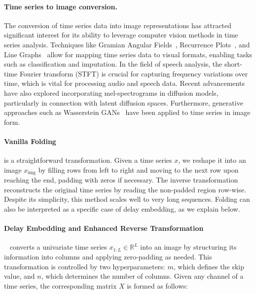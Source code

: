 \documentclass{article}
\theoremstyle{plain}
\theoremstyle{definition}
\theoremstyle{remark}
\begin{document}
\paragraph{Time series to image conversion.} The conversion of time series data into image representations has attracted significant interest for its ability to leverage computer vision methods in time series analysis. Techniques like Gramian Angular Fields~\cite{wang2015imaging}, Recurrence Plots~\cite{hatami2018classification}, and Line Graphs~\cite{li2024time} allow for mapping time series data to visual formats, enabling tasks such as classification and imputation. In the field of speech analysis, the short-time Fourier transform (STFT) \cite{allen1977short, allen1977unified, vetterli1992wavelets, flandrin2004empirical} is crucial for capturing frequency variations over time, which is vital for processing audio and speech data. Recent advancements have also explored incorporating mel-spectrograms in diffusion models, particularly in connection with latent diffusion spaces\cite{popov2021grad, chen2022resgrad, liu2023audioldm}. Furthermore, generative approaches such as Wasserstein GANs~\cite{brophy2019quick, hellermann2021leveraging} have been applied to time series in image form.

\paragraph{Vanilla Folding} is a straightforward transformation. Given a time series $x$, we reshape it into an image $x_\text{img}$ by filling rows from left to right and moving to the next row upon reaching the end, padding with zeros if necessary. The inverse transformation reconstructs the original time series by reading the non-padded region row-wise. Despite its simplicity, this method scales well to very long sequences. Folding can also be interpreted as a specific case of delay embedding, as we explain below.

\paragraph{Delay Embedding and Enhanced Reverse Transformation}

~\cite{takens2006detecting} converts a univariate time series \( x_{1:L} \in \mathbb{R}^L \) into an image by structuring its information into columns and applying zero-padding as needed. This transformation is controlled by two hyperparameters: \( m \), which defines the skip value, and \( n \), which determines the number of columns. Given any channel of a time series, the corresponding matrix \( X \) is formed as follows:
\end{document}
